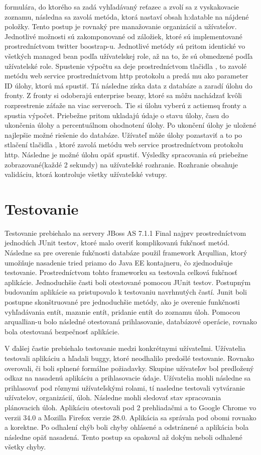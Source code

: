 formulára, do ktorého sa zadá vyhľadávaný reťazec a zvolí sa z vyskakovacie zoznamu, následna sa zavolá metóda, ktorá nastaví obsah h:datable na nájdené položky. Tento postup je rovnaký pre manažovanie organizácií a užívateĺov. Jednotlivé možnosti sú zakomponované od záložiek, ktoré sú implementované prostredníctvom twitter boostrap-u. Jednotlivé metódy sú pritom identické vo všetkých managed bean podľa užívatelskej role, až na to, že sú obmedzené podľa užívatelské role. Spustenie výpočtu sa deje prostredníctvom tlačidla , to zavolé metódu  web service prostredníctvom http protokolu a predá mu ako parameter ID úlohy, ktorú má spustiť. Tá následne získa data z databáze a zaradí úlohu do fronty. Z fronty si odoberajú enterprise beany, ktoré sa môžu nachádzať kvôli rozprestrenie záťaže na viac serveroch. Tie si úlohu vyberú z actiemsq fronty a spustia výpočet. Priebežne pritom ukladajú údaje o stavu úlohy, času do ukončenia úlohy a percentuálnom ohodnotení úlohy. Po ukončení úlohy je uložené najlepšie možné riešenie do databáze. Užívateľ môže úlohy pozastaviť a to po stlačení tlačidla , ktoré zavolá metódu web service prostredníctvom protokolu http. Následne je možné úlohu opäť spustiť. Výsledky spracovania sú priebežne zobrazované(každé 2 sekundy) na užívateľské rozhranie. Rozhranie obsahuje validáciu, ktorá kontroluje všetky užívateľské vstupy.



\section{Testovanie}
Testovanie prebiehalo na servery JBoss AS 7.1.1 Final najprv prostredníctvom jednodúch JUnit testov, ktoré malo overiť komplikovanú fukčnosť metód. Následne sa pre overenie fukčnosti databáze použil framework Arqullian, ktorý umožňuje nasadenie tried priamo do Java EE kontajneru, čo zjednodušuje testovanie. Prostredníctvom tohto frameworku sa testovala celková fukčnosť aplikácie. Jednoduchšie časti boli otestované pomocou JUnit testov. Postupným budovaním aplikácie sa pristupovalo k testovaniu navrhnutých častí. Junit boli postupne skonštruované pre jednoduchšie metódy, ako je overenie funkčnosti vyhľadávania entít, mazanie entít, pridanie entít do zoznamu úloh. Pomocou arquallian-u bolo následné otestovaná prihlasovanie, databázové operácie, rovnako bola otestovaná bezpečnosť aplikácie.


V ďalšej častie prebiehalo testovanie medzi konkrétnymi užívateľmi. Užívatelia testovali aplikáciu a hľadali buggy, ktoré neodhalilo predošlé testovanie. Rovnako overovali, či boli splnené formálne požiadavky. Skupine užívateľov bol predložený odkaz na nasadenú aplikáciu a prihlasovacie údaje. Užívatelia mohli následne sa prihlasovať pod rôznymi užívateľskými rolami, tí nasledne testovali vytváranie užívatelov, organizácií, úloh. Následne mohli sledovať stav spracovania plánovacich úloh. Aplikáciu otestovali pod 2 prehliadačmi a to Google Chrome vo verzii 34.0 a Mozilla Firefox verzie 28.0. Aplikácia sa správala pod obomi rovnako a korektne. Po odhalení chýb boli chyby ohlásené a odstránené a aplikácia bola následne opäť nasadená. Tento postup sa opakoval až dokým neboli odhalené všetky chyby.




